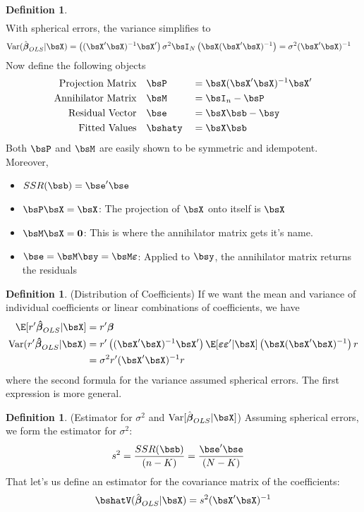 \documentclass[12pt]{article}
\theoremstyle{plain}
\theoremstyle{definition}
\newtheorem{defn}[thm]{Definition}
\theoremstyle{remark}
\newcommand{\bsvarepsilon}{\boldsymbol{\varepsilon}}
\newcommand{\bsbeta}{\boldsymbol{\beta}}
\newcommand{\bshatbeta}{\boldsymbol{\hat{\beta}}}
\renewcommand{\bso}{\boldsymbol{0}}
\newcommand{\Var}{\operatorname{Var}}
\begin{document}
\begin{defn}
\begin{align*}
\end{align*}
With spherical errors, the variance simplifies to
\begin{align*}
  \Var(\hat{\bsbeta}_{OLS}|\bsX)
  &=
  \left((\bsX'\bsX)^{-1}\bsX'\right)
  \sigma^2 \bsI_N
  \left(\bsX(\bsX'\bsX)^{-1}\right)
  =\sigma^2 (\bsX'\bsX)^{-1}
\end{align*}
Now define the following objects
\begin{alignat*}{3}
  \text{Projection Matrix}&\quad
  \bsP &&= \bsX(\bsX'\bsX)^{-1}\bsX' \\
  \text{Annihilator Matrix}&\quad
  \bsM &&= \bsI_n - \bsP \\
  \text{Residual Vector}&\quad
  \bse &&= \bsX\bsb - \bsy \\
  \text{Fitted Values}&\quad
  \bshaty &&= \bsX\bsb
\end{alignat*}
Both $\bsP$ and $\bsM$ are easily shown to be symmetric and idempotent.
Moreover,
\begin{itemize}
  \item $SSR(\bsb) = \bse'\bse$
  \item $\bsP\bsX=\bsX$: The projection of $\bsX$ onto itself is $\bsX$
  \item $\bsM\bsX = \bso$: This is where the annihilator matrix gets
    it's name.
  \item $\bse = \bsM\bsy = \bsM \bsvarepsilon$: Applied to $\bsy$, the
    annihilator matrix returns the residuals
\end{itemize}
\end{defn}

\begin{defn}(Distribution of Coefficients)
If we want the mean and variance of individual coefficients or linear
combinations of coefficients, we have
\begin{align*}
  \E[r'\bshatbeta_{OLS}|\bsX]
  &= r'\bsbeta \\
  \Var(r'\bshatbeta_{OLS}|\bsX)
  &=
  r'\left((\bsX'\bsX)^{-1}\bsX'\right)
  \E[\bsvarepsilon\bsvarepsilon' |\bsX]
  \left(\bsX(\bsX'\bsX)^{-1}\right) r \\
  &=
  \sigma^2r'(\bsX'\bsX)^{-1} r
\end{align*}
where the second formula for the variance assumed spherical errors. The
first expression is more general.
\end{defn}

\begin{defn}(Estimator for $\sigma^2$ and $\Var[\hat{\bsbeta}_{OLS}|\bsX]$)
Assuming spherical errors, we form the estimator for $\sigma^2$:
\begin{align*}
  s^2 &= \frac{SSR(\bsb)}{(n-K)} = \frac{\bse'\bse}{(N-K)}
\end{align*}
That let's us define an estimator for the covariance matrix of the
coefficients:
\begin{align*}
  \bshatV(\hat{\bsbeta}_{OLS}|\bsX) = s^2(\bsX'\bsX)^{-1}
\end{align*}
\end{defn}
\end{document}
